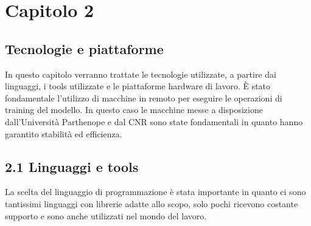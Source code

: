 \def\baselinestretch{1}
\chapter*{Capitolo 2} \label{cap2}
\def\baselinestretch{1.66}

\section*{Tecnologie e piattaforme}
\def\baselinestretch{1.66}
\noindent In questo capitolo verranno trattate le tecnologie utilizzate, a partire dai linguaggi, i tools utilizzate e le piattaforme hardware di lavoro. È stato fondamentale l’utilizzo di macchine in remoto per eseguire le operazioni di training del modello. In questo caso le macchine messe a disposizione dall’Università Parthenope e dal CNR sono state fondamentali in quanto hanno garantito stabilità ed efficienza.

\section*{2.1 Linguaggi e tools}
\def\baselinestretch{1.66}
\noindent La scelta del linguaggio di programmazione è stata importante in quanto ci sono tantissimi linguaggi con librerie adatte allo scopo, solo pochi ricevono costante supporto e sono anche utilizzati nel mondo del lavoro.

